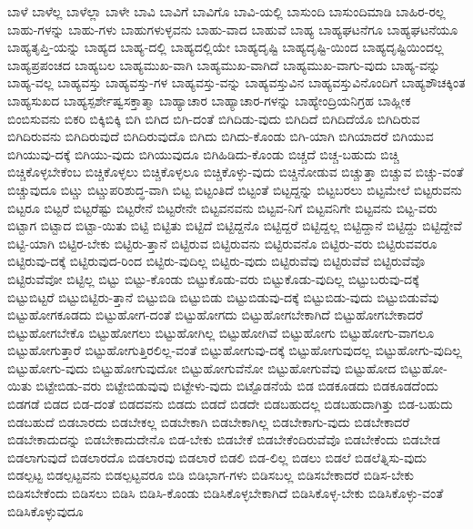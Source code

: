 {ಬಾಳೆ
ಬಾಳೆಲ್ಲ
ಬಾಳೆಲ್ಲಾ
ಬಾಳೇ
ಬಾವಿ
ಬಾವಿಗೆ
ಬಾವಿಗೊ
ಬಾವಿ-ಯಲ್ಲಿ
ಬಾಸುಂದಿ
ಬಾಸುಂದಿಮಾಡಿ
ಬಾಹಿರ-ರಲ್ಲ
ಬಾಹು-ಗಳನ್ನು
ಬಾಹು-ಗಳು
ಬಾಹುಗಳುಳ್ಳವನು
ಬಾಹು-ವಾದ
ಬಾಹುವೆ
ಬಾಹ್ಯ
ಬಾಹ್ಯಘಟನೆಗೂ
ಬಾಹ್ಯಘಟನೆಯೂ
ಬಾಹ್ಯತೃಪ್ತಿ-ಯನ್ನು
ಬಾಹ್ಯದ
ಬಾಹ್ಯ-ದಲ್ಲಿ
ಬಾಹ್ಯದಲ್ಲಿಯೇ
ಬಾಹ್ಯದೃಷ್ಟಿ
ಬಾಹ್ಯದೃಷ್ಟಿ-ಯಿಂದ
ಬಾಹ್ಯದೃಷ್ಟಿಯಿಂದಲ್ಲ
ಬಾಹ್ಯಪ್ರಪಂಚದ
ಬಾಹ್ಯಬಲ
ಬಾಹ್ಯಮುಖ-ವಾಗಿ
ಬಾಹ್ಯಮುಖ-ವಾಗಿದೆ
ಬಾಹ್ಯಮುಖ-ವಾಗು-ವುದು
ಬಾಹ್ಯ-ವನ್ನು
ಬಾಹ್ಯ-ವಲ್ಲ
ಬಾಹ್ಯವಸ್ತು
ಬಾಹ್ಯವಸ್ತು-ಗಳ
ಬಾಹ್ಯವಸ್ತು-ವನ್ನು
ಬಾಹ್ಯವಸ್ತುವಿನ
ಬಾಹ್ಯವಸ್ತುವಿನೊಂದಿಗೆ
ಬಾಹ್ಯಶೌಚಕ್ಕಿಂತ
ಬಾಹ್ಯಸುಖದ
ಬಾಹ್ಯಸ್ಪರ್ಶೇಷ್ವಸಕ್ತಾತ್ಮಾ
ಬಾಹ್ಯಾಚಾರ
ಬಾಹ್ಯಾಚಾರ-ಗಳನ್ನು
ಬಾಹ್ಯೇಂದ್ರಿಯನಿಗ್ರಹ
ಬಾಹ್ಲೀಕ
ಬಿಂಬಿಸುವನು
ಬಿಕರಿ
ಬಿಕ್ಕಿಬಿಕ್ಕಿ
ಬಿಗಿ
ಬಿಗಿದ
ಬಿಗಿ-ದಂತೆ
ಬಿಗಿದಿಡು-ವುದು
ಬಿಗಿದಿದೆ
ಬಿಗಿದಿದೆಯೊ
ಬಿಗಿದಿರುವ
ಬಿಗಿದಿರುವನು
ಬಿಗಿದಿರುವುದೆ
ಬಿಗಿದಿರುವುದೊ
ಬಿಗಿದು
ಬಿಗಿದು-ಕೊಂಡು
ಬಿಗಿ-ಯಾಗಿ
ಬಿಗಿಯಾದರೆ
ಬಿಗಿಯುವ
ಬಿಗಿಯುವು-ದಕ್ಕೆ
ಬಿಗಿಯು-ವುದು
ಬಿಗಿಯುವುದೂ
ಬಿಗಿಹಿಡಿದು-ಕೊಂಡು
ಬಿಚ್ಚದೆ
ಬಿಚ್ಚ-ಬಹುದು
ಬಿಚ್ಚಿ
ಬಿಚ್ಚಿಕೊಳ್ಳಬೇಕೆಂಬ
ಬಿಚ್ಚಿಕೊಳ್ಳಲು
ಬಿಚ್ಚಿಕೊಳ್ಳಲೂ
ಬಿಚ್ಚಿಕೊಳ್ಳು-ವುದು
ಬಿಚ್ಚಿನೋಡುವ
ಬಿಚ್ಚುತ್ತಾ
ಬಿಚ್ಚುವ
ಬಿಚ್ಚು-ವಂತೆ
ಬಿಚ್ಚುವುದೂ
ಬಿಟ್ಚು
ಬಿಟ್ಚುಪರಿಶುದ್ಧ-ವಾಗಿ
ಬಿಟ್ಟ
ಬಿಟ್ಟಂತಿದೆ
ಬಿಟ್ಟಂತೆ
ಬಿಟ್ಟದ್ದನ್ನು
ಬಿಟ್ಟಬರಲು
ಬಿಟ್ಟಮೇಲೆ
ಬಿಟ್ಟರುವನು
ಬಿಟ್ಟರೂ
ಬಿಟ್ಟರೆ
ಬಿಟ್ಟರೆಷ್ಟು
ಬಿಟ್ಟರೇನೆ
ಬಿಟ್ಟರೇನೇ
ಬಿಟ್ಟವನವನು
ಬಿಟ್ಟವ-ನಿಗೆ
ಬಿಟ್ಟವನಿಗೇ
ಬಿಟ್ಟವನು
ಬಿಟ್ಟ-ವರು
ಬಿಟ್ಟಾಗ
ಬಿಟ್ಟಾದ
ಬಿಟ್ಟಾ-ಯಿತು
ಬಿಟ್ಟಿ
ಬಿಟ್ಟಿತು
ಬಿಟ್ಟಿದೆ
ಬಿಟ್ಟಿದ್ದನೊ
ಬಿಟ್ಟಿದ್ದರೆ
ಬಿಟ್ಟಿದ್ದಲ್ಲ
ಬಿಟ್ಟಿದ್ದಾನೆ
ಬಿಟ್ಟಿದ್ದು
ಬಿಟ್ಟಿದ್ದೇವೆ
ಬಿಟ್ಟಿ-ಯಾಗಿ
ಬಿಟ್ಟಿರ-ಬೇಕು
ಬಿಟ್ಟಿರು-ತ್ತಾನೆ
ಬಿಟ್ಟಿರುವ
ಬಿಟ್ಟಿರುವನು
ಬಿಟ್ಟಿರುವನೊ
ಬಿಟ್ಟಿರು-ವರು
ಬಿಟ್ಟಿರುವವರೂ
ಬಿಟ್ಟಿರುವು-ದಕ್ಕೆ
ಬಿಟ್ಟಿರುವುದ-ರಿಂದ
ಬಿಟ್ಟಿರು-ವುದಿಲ್ಲ
ಬಿಟ್ಟಿರು-ವುದು
ಬಿಟ್ಟಿರುವೆವು
ಬಿಟ್ಟಿರುವೆವೆ
ಬಿಟ್ಟಿರುವೆವೊ
ಬಿಟ್ಟಿರುವೆವೋ
ಬಿಟ್ಟಿಲ್ಲ
ಬಿಟ್ಟು
ಬಿಟ್ಟು-ಕೊಂಡು
ಬಿಟ್ಟುಕೊಡು-ವರು
ಬಿಟ್ಟುಕೊಡು-ವುದಿಲ್ಲ
ಬಿಟ್ಟುಬರುವು-ದಕ್ಕೆ
ಬಿಟ್ಟುಬಿಟ್ಟರೆ
ಬಿಟ್ಟುಬಿಟ್ಟಿರು-ತ್ತಾನೆ
ಬಿಟ್ಟುಬಿಡಿ
ಬಿಟ್ಟುಬಿಡು
ಬಿಟ್ಟುಬಿಡುವು-ದಕ್ಕೆ
ಬಿಟ್ಟುಬಿಡು-ವುದು
ಬಿಟ್ಟುಬಿಡುವೆವು
ಬಿಟ್ಟುಹೋಗಕೂಡದು
ಬಿಟ್ಟುಹೋಗ-ದಂತೆ
ಬಿಟ್ಟುಹೋಗದು
ಬಿಟ್ಟುಹೋಗಬೇಕಾಗಿದೆ
ಬಿಟ್ಟುಹೋಗಬೇಕಾದರೆ
ಬಿಟ್ಟುಹೋಗಬೇಕೊ
ಬಿಟ್ಟುಹೋಗಲು
ಬಿಟ್ಟುಹೋಗಿಲ್ಲ
ಬಿಟ್ಟುಹೋಗಿವೆ
ಬಿಟ್ಟುಹೋಗು
ಬಿಟ್ಟುಹೋಗು-ವಾಗಲೂ
ಬಿಟ್ಟುಹೋಗುತ್ತಾರೆ
ಬಿಟ್ಟುಹೋಗುತ್ತಿರಲಿಲ್ಲ-ವಂತೆ
ಬಿಟ್ಟುಹೋಗುವು-ದಕ್ಕೆ
ಬಿಟ್ಟುಹೋಗುವುದಲ್ಲ
ಬಿಟ್ಟುಹೋಗು-ವುದಿಲ್ಲ
ಬಿಟ್ಟುಹೋಗು-ವುದು
ಬಿಟ್ಟುಹೋಗುವುದೋ
ಬಿಟ್ಟುಹೋಗುವೆನೋ
ಬಿಟ್ಟುಹೋಗುವೆವು
ಬಿಟ್ಟುಹೋದ
ಬಿಟ್ಟುಹೋ-ಯಿತು
ಬಿಟ್ಟೇಬಿಡು-ವರು
ಬಿಟ್ಟೇಬಿಡುವುವು
ಬಿಟ್ಟೇಳು-ವುದು
ಬಿಟ್ಟೊಡನೆಯೆ
ಬಿಡ
ಬಿಡಕೂಡದು
ಬಿಡಕೂಡದೆಂದು
ಬಿಡಗಡೆ
ಬಿಡದ
ಬಿಡ-ದಂತೆ
ಬಿಡದವನು
ಬಿಡದು
ಬಿಡದೆ
ಬಿಡದೇ
ಬಿಡಬಹುದಲ್ಲ
ಬಿಡಬಹುದಾಗಿತ್ತು
ಬಿಡ-ಬಹುದು
ಬಿಡಬಹುದೆ
ಬಿಡಬಾರದು
ಬಿಡಬೇಕಲ್ಲ
ಬಿಡಬೇಕಾಗಿ
ಬಿಡಬೇಕಾಗಿಲ್ಲ
ಬಿಡಬೇಕಾಗು-ವುದು
ಬಿಡಬೇಕಾದರೆ
ಬಿಡಬೇಕಾದುದನ್ನು
ಬಿಡಬೇಕಾದುದೇನೊ
ಬಿಡ-ಬೇಕು
ಬಿಡಬೇಕೆ
ಬಿಡಬೇಕೆಂದಿರುವೆವೊ
ಬಿಡಬೇಕೆಂದು
ಬಿಡಬೇಡ
ಬಿಡಲಾಗುವುದೆ
ಬಿಡಲಾರದೊ
ಬಿಡಲಾರವು
ಬಿಡಲಾರೆ
ಬಿಡಲಿ
ಬಿಡ-ಲಿಲ್ಲ
ಬಿಡಲು
ಬಿಡಲೆ
ಬಿಡಲೆತ್ನಿಸು-ವುದು
ಬಿಡಲ್ಪಟ್ಟ
ಬಿಡಲ್ಪಟ್ಟವನು
ಬಿಡಲ್ಪಟ್ಟವರೂ
ಬಿಡಿ
ಬಿಡಿಭಾಗ-ಗಳು
ಬಿಡಿಸಬಲ್ಲ
ಬಿಡಿಸಬೇಕಾದರೆ
ಬಿಡಿಸ-ಬೇಕು
ಬಿಡಿಸಬೇಕೆಂದು
ಬಿಡಿಸಲು
ಬಿಡಿಸಿ
ಬಿಡಿಸಿ-ಕೊಂಡು
ಬಿಡಿಸಿಕೊಳ್ಳಬೇಕಾಗಿದೆ
ಬಿಡಿಸಿಕೊಳ್ಳ-ಬೇಕು
ಬಿಡಿಸಿಕೊಳ್ಳು-ವಂತೆ
ಬಿಡಿಸಿಕೊಳ್ಳುವುದೂ
}
